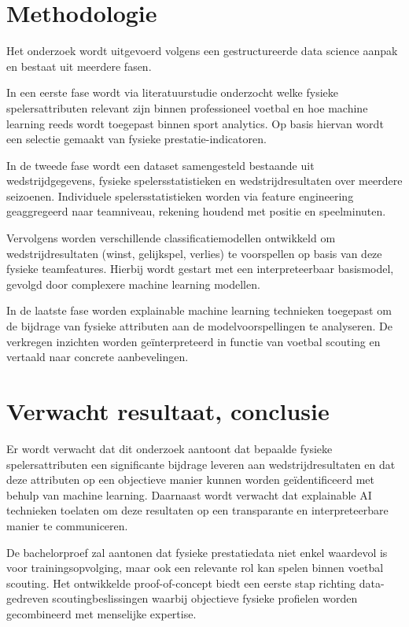 

\section{Methodologie}%
\label{sec:methodologie}

Het onderzoek wordt uitgevoerd volgens een gestructureerde data science aanpak en bestaat uit meerdere fasen.

In een eerste fase wordt via literatuurstudie onderzocht welke fysieke spelersattributen relevant zijn binnen professioneel voetbal en hoe machine learning reeds wordt toegepast binnen sport analytics. Op basis hiervan wordt een selectie gemaakt van fysieke prestatie-indicatoren.

In de tweede fase wordt een dataset samengesteld bestaande uit wedstrijdgegevens, fysieke spelersstatistieken en wedstrijdresultaten over meerdere seizoenen. Individuele spelersstatistieken worden via feature engineering geaggregeerd naar teamniveau, rekening houdend met positie en speelminuten.

Vervolgens worden verschillende classificatiemodellen ontwikkeld om wedstrijdresultaten (winst, gelijkspel, verlies) te voorspellen op basis van deze fysieke teamfeatures. Hierbij wordt gestart met een interpreteerbaar basismodel, gevolgd door complexere machine learning modellen.

In de laatste fase worden explainable machine learning technieken toegepast om de bijdrage van fysieke attributen aan de modelvoorspellingen te analyseren. De verkregen inzichten worden geïnterpreteerd in functie van voetbal scouting en vertaald naar concrete aanbevelingen.

\section{Verwacht resultaat, conclusie}%
\label{sec:verwachte_resultaten}

Er wordt verwacht dat dit onderzoek aantoont dat bepaalde fysieke spelersattributen een significante bijdrage leveren aan wedstrijdresultaten en dat deze attributen op een objectieve manier kunnen worden geïdentificeerd met behulp van machine learning. Daarnaast wordt verwacht dat explainable AI technieken toelaten om deze resultaten op een transparante en interpreteerbare manier te communiceren.

De bachelorproef zal aantonen dat fysieke prestatiedata niet enkel waardevol is voor trainingsopvolging, maar ook een relevante rol kan spelen binnen voetbal scouting. Het ontwikkelde proof-of-concept biedt een eerste stap richting data-gedreven scoutingbeslissingen waarbij objectieve fysieke profielen worden gecombineerd met menselijke expertise.